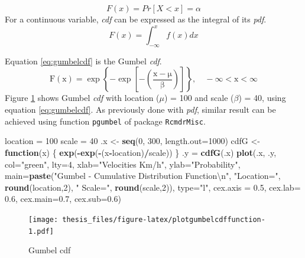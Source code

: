 \documentclass[12pt,oneside]{reedthesis}
\newenvironment{Shaded}{\begin{snugshade}}{\end{snugshade}}
\newcommand{\CharTok}[1]{\textcolor[rgb]{0.31,0.60,0.02}{#1}}
\newcommand{\ControlFlowTok}[1]{\textcolor[rgb]{0.13,0.29,0.53}{\textbf{#1}}}
\newcommand{\DataTypeTok}[1]{\textcolor[rgb]{0.13,0.29,0.53}{#1}}
\newcommand{\DecValTok}[1]{\textcolor[rgb]{0.00,0.00,0.81}{#1}}
\newcommand{\FloatTok}[1]{\textcolor[rgb]{0.00,0.00,0.81}{#1}}
\newcommand{\KeywordTok}[1]{\textcolor[rgb]{0.13,0.29,0.53}{\textbf{#1}}}
\newcommand{\NormalTok}[1]{#1}
\newcommand{\OperatorTok}[1]{\textcolor[rgb]{0.81,0.36,0.00}{\textbf{#1}}}
\newcommand{\StringTok}[1]{\textcolor[rgb]{0.31,0.60,0.02}{#1}}
\begin{document}
\[
F(x) = Pr[X < x] = \alpha
\]
For a continuous variable, \emph{cdf} can be expressed as the integral of its \emph{pdf}.
\[
F(x) = \int_{-\infty}^x f(x)dx
\]

Equation \eqref{eq:gumbelcdf} is the Gumbel \emph{cdf}.
\begin{equation}
\mathrm{
        F(x) = \exp\left\{-\exp\left[-\left(\frac{x-\mu}{\beta}\right)\right]\right\}, 
        \quad -\infty < x < \infty
        }
  \label{eq:gumbelcdf}
\end{equation}
Figure \ref{fig:plotgumbelcdffunction} shows Gumbel \emph{cdf} with location (\(\mu\)) = 100 and scale (\(\beta\)) = 40, using equation \eqref{eq:gumbelcdf}. As previously done with \emph{pdf}, similar result can be achieved using function \texttt{pgumbel} of package \texttt{RcmdrMisc}.

\footnotesize
\begin{Shaded}
\begin{Highlighting}[]
\NormalTok{location =}\StringTok{ }\DecValTok{100}
\NormalTok{scale =}\StringTok{ }\DecValTok{40}
\NormalTok{.x <-}\StringTok{ }\KeywordTok{seq}\NormalTok{(}\DecValTok{0}\NormalTok{, }\DecValTok{300}\NormalTok{, }\DataTypeTok{length.out=}\DecValTok{1000}\NormalTok{)}
\NormalTok{cdfG <-}\StringTok{ }\ControlFlowTok{function}\NormalTok{(x) \{}
  \KeywordTok{exp}\NormalTok{(}\OperatorTok{-}\KeywordTok{exp}\NormalTok{(}\OperatorTok{-}\NormalTok{(x}\OperatorTok{-}\NormalTok{location)}\OperatorTok{/}\NormalTok{scale))}
\NormalTok{  \}}
\NormalTok{.y =}\StringTok{ }\KeywordTok{cdfG}\NormalTok{(.x)}
\KeywordTok{plot}\NormalTok{(.x, .y, }\DataTypeTok{col=}\StringTok{"green"}\NormalTok{, }\DataTypeTok{lty=}\DecValTok{4}\NormalTok{, }
     \DataTypeTok{xlab=}\StringTok{"Velocities Km/h"}\NormalTok{, }\DataTypeTok{ylab=}\StringTok{"Probability"}\NormalTok{, }
     \DataTypeTok{main=}\KeywordTok{paste}\NormalTok{(}\StringTok{"Gumbel - Cumulative Distribution Function}\CharTok{\textbackslash{}n}\StringTok{"}\NormalTok{, }\StringTok{"Location="}\NormalTok{, }
     \KeywordTok{round}\NormalTok{(location,}\DecValTok{2}\NormalTok{), }\StringTok{" Scale="}\NormalTok{, }\KeywordTok{round}\NormalTok{(scale,}\DecValTok{2}\NormalTok{)), }\DataTypeTok{type=}\StringTok{"l"}\NormalTok{, }
     \DataTypeTok{cex.axis =} \FloatTok{0.5}\NormalTok{, }\DataTypeTok{cex.lab=} \FloatTok{0.6}\NormalTok{, }\DataTypeTok{cex.main=}\FloatTok{0.7}\NormalTok{, }\DataTypeTok{cex.sub=}\FloatTok{0.6}\NormalTok{)}
\end{Highlighting}
\end{Shaded}
\begin{figure}
\centering
\texttt{[image: thesis\_files/figure-latex/plotgumbelcdffunction-1.pdf]}
\caption{\label{fig:plotgumbelcdffunction}Gumbel cdf}
\end{figure}
\normalsize
\end{document}
